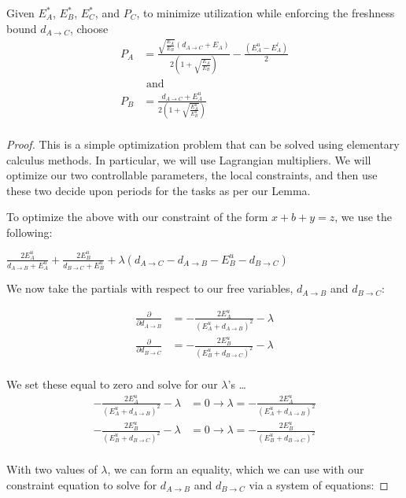 \begin{theorem}
	\label{thm:3TaskResult}
	Given $E^*_A$, $E^*_B$, $E^*_C$, and $P_C$, to minimize utilization while enforcing the freshness bound $d_{A \to C}$, choose
	\begin{align*}
		P_A &= \frac{\sqrt{\frac{E_A}{E_B}}(d_{A \to C}+E_A)}{2(1+\sqrt{\frac{E_A}{E_B}})} - \frac{(E^u_A - E^l_A)}{2}\\
		& \text{ and }\\
		P_B &= \frac{d_{A \to C}+E^u_A}{2(1+\sqrt{\frac{E^u_A}{E^u_B}})}\\
	\end{align*}
\end{theorem}

\begin{proof}
	This is a simple optimization problem that can be solved using elementary calculus methods. In particular, we will use Lagrangian multipliers. We will optimize our two controllable parameters, the local constraints, and then use these two decide upon periods for the tasks as per our Lemma.
	
	To optimize the above with our constraint of the form $x+b+y=z$, we use the following:
	\begin{center}
		$\frac{2E^u_A}{d_{A \to B}+E^u_A} + \frac{2E^u_B}{d_{B \to C}+E^u_B} + \lambda (d_{A \to C}-d_{A \to B}-E^u_B-d_{B \to C})$
	\end{center}
	
	We now take the partials with respect to our free variables, $d_{A \to B}$ and $d_{B \to C}$:
	
	\begin{align*}
		\frac{\partial}{\partial d_{A \to B}} &= -\frac{2 E^u_A}{(E^u_A+d_{A \to B})^2}-\lambda\\
		\frac{\partial}{\partial d_{B \to C}} &= -\frac{2 E^u_B}{(E^u_B+d_{B \to C})^2}-\lambda\\
	\end{align*}
	
	We set these equal to zero and solve for our $\lambda$'s \ldots
	\begin{align*}
		-\frac{2 E^u_A}{(E^u_A+d_{A \to B})^2}-\lambda &= 0 \to \lambda = -\frac{2 E^u_A}{(E^u_A+d_{A \to B})^2}\\
		-\frac{2 E^u_B}{(E^u_B+d_{B \to C})^2}-\lambda &= 0 \to \lambda = -\frac{2 E^u_B}{(E^u_B+d_{B \to C})^2}\\
	\end{align*}
	
	With two values of $\lambda$, we can form an equality, which we can use with our constraint equation to solve for $d_{A \to B}$ and $d_{B \to C}$ via a system of equations:
	

\end{proof}
